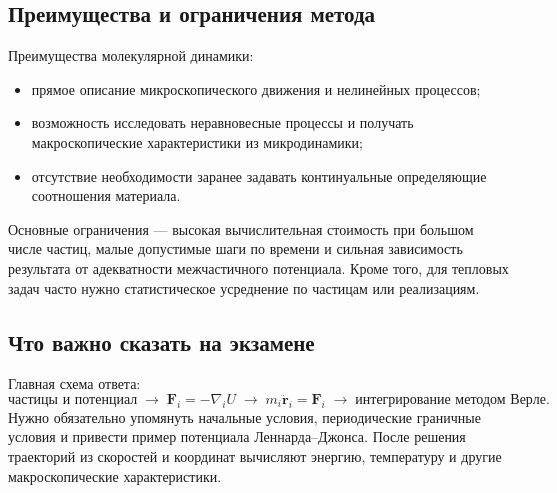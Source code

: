 \subsection{Преимущества и ограничения метода}

Преимущества молекулярной динамики:
\begin{itemize}
    \item прямое описание микроскопического движения и нелинейных процессов;
    \item возможность исследовать неравновесные процессы и получать
    макроскопические характеристики из микродинамики;
    \item отсутствие необходимости заранее задавать континуальные
    определяющие соотношения материала.
\end{itemize}
Основные ограничения --- высокая вычислительная стоимость при большом числе
частиц, малые допустимые шаги по времени и сильная зависимость результата от
адекватности межчастичного потенциала. Кроме того, для тепловых задач часто
нужно статистическое усреднение по частицам или реализациям.

\subsection{Что важно сказать на экзамене}

Главная схема ответа:
\[
    \text{частицы и потенциал}
    \;\longrightarrow\;
    \mathbf F_i=-\nabla_i U
    \;\longrightarrow\;
    m_i\ddot{\mathbf r}_i=\mathbf F_i
    \;\longrightarrow\;
    \text{интегрирование методом Верле}.
\]
Нужно обязательно упомянуть начальные условия, периодические граничные условия
и привести пример потенциала Леннарда--Джонса. После решения траекторий из
скоростей и координат вычисляют энергию, температуру и другие макроскопические
характеристики.

\newpage

